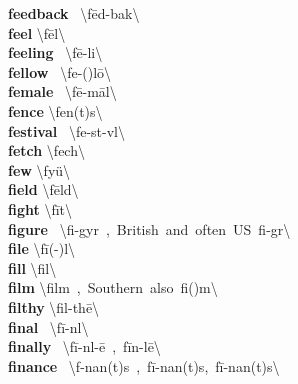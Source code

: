 \documentclass[10pt,a4paper]{article}
\begin{document}
\begin{multicols}{2}
\textbf{ feedback }\quad \ \textbackslash \textprimstress f\={e}d-\textsecstress bak\textbackslash \\
\textbf{ feel }\quad \textbackslash \textprimstress f\={e}l\textbackslash \\
\textbf{ feeling }\quad \ \textbackslash \textprimstress f\={e}-li\engma \textbackslash \\
\textbf{ fellow }\quad \ \textbackslash \textprimstress fe-(\textsecstress )l\={o}\textbackslash \\
\textbf{ female }\quad \ \textbackslash \textprimstress f\={e}-\textsecstress m\={a}l\textbackslash \\
\textbf{ fence }\quad \textbackslash \textprimstress fen(t)s\textbackslash \\
\textbf{ festival }\quad \ \textbackslash \textprimstress fe-st\textschwa -v\textschwa l\textbackslash \\
\textbf{ fetch }\quad \textbackslash \textprimstress fech\textbackslash \\
\textbf{ few }\quad \textbackslash \textprimstress fy\"{u}\textbackslash \\
\textbf{ field }\quad \textbackslash \textprimstress f\={e}ld\textbackslash \\
\textbf{ fight }\quad \textbackslash \textprimstress f\={i}t\textbackslash \\
\textbf{ figure }\quad \ \textbackslash \textprimstress fi-gy\textschwa r\ ,\ British\ and\ often\ US\ \textprimstress fi-g\textschwa r\textbackslash \\
\textbf{ file }\quad \textbackslash \textprimstress f\={i}(-\textschwa )l\textbackslash \\
\textbf{ fill }\quad \textbackslash \textprimstress fil\textbackslash \\
\textbf{ film }\quad \textbackslash \textprimstress film\ ,\ Southern\ also\ \textprimstress fi(\textschwa )m\textbackslash \\
\textbf{ filthy }\quad \textbackslash \textprimstress fil-th\={e}\textbackslash \\
\textbf{ final }\quad \ \textbackslash \textprimstress f\={i}-n\textsuperscript{\textreve}l\textbackslash \\
\textbf{ finally }\quad \ \textbackslash \textprimstress f\={i}-n\textsuperscript{\textreve}l-\={e}\ ,\ \textprimstress f\={i}n-l\={e}\textbackslash \\
\textbf{ finance }\quad \ \textbackslash f\textschwa -\textprimstress nan(t)s\ ,\ \textprimstress f\={i}-\textsecstress nan(t)s,\ f\={i}-\textprimstress nan(t)s\textbackslash \\

\end{multicols}
\end{document}
